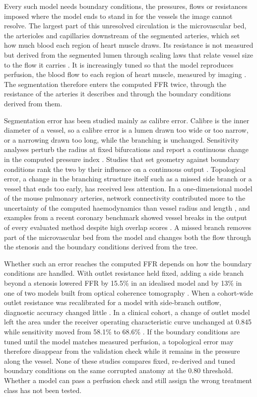 \documentclass[journal]{IEEEtran}
\begin{document}
Every such model needs boundary conditions, the pressures, flows or resistances imposed where the model ends to stand in for the vessels the image cannot resolve. The largest part of this unresolved circulation is the
microvascular bed, the arterioles and capillaries downstream of the segmented arteries, which set how much blood
each region of heart muscle draws. Its resistance is not measured but derived from the segmented lumen through
scaling laws that relate vessel size to the flow it carries \cite{murray1926,kim2010}. It is increasingly tuned so
that the model reproduces perfusion, the blood flow to each region of heart muscle, measured by imaging
\cite{menon2024}. The segmentation therefore enters the computed FFR twice, through the resistance of the arteries it describes and through the boundary conditions derived from them.

Segmentation error has been studied mainly as calibre error. Calibre is the inner diameter of a vessel, so a calibre error is a lumen drawn too wide or too narrow, or a narrowing drawn too long, while the branching is unchanged. Sensitivity analyses perturb the radius at fixed bifurcations and report a continuous change in the computed pressure index \cite{sankaran2015tmi,sankaran2015cmame,fernandez2024,dalmaso2025}. Studies that set geometry against
boundary conditions rank the two by their influence on a continuous output \cite{sankaran2016,tanade2022,korte2023}. Topological error, a change in the branching structure itself such as a missed side branch or a vessel that ends too early, has received less attention. In a one-dimensional model of the mouse pulmonary arteries, network connectivity contributed more to the uncertainty of the computed haemodynamics than vessel radius and length \cite{colebank2019}, and examples from a recent coronary benchmark showed vessel breaks in the output of every evaluated method despite high overlap scores \cite{bransby2026}. A missed branch removes part of the microvascular bed from the model and changes both the flow
through the stenosis and the boundary conditions derived from the tree.

Whether such an error reaches the computed FFR depends on how the boundary conditions are handled. With outlet resistance held fixed, adding a side branch beyond a stenosis lowered FFR by 15.5\% in an idealised model and by 13\% in one of two models built from optical coherence tomography \cite{gamage2022}. When a cohort-wide outlet resistance was recalibrated for a model with side-branch outflow, diagnostic accuracy changed little \cite{gosling2020}. In a clinical cohort, a change of outlet
model left the area under the receiver operating characteristic curve unchanged at 0.845 while sensitivity moved
from 58.1\% to 68.6\% \cite{fossan2026}. If the boundary conditions are tuned until the model matches measured
perfusion, a topological error may therefore disappear from the validation check while it remains in the pressure
along the vessel. None of these studies compares fixed, re-derived and tuned boundary conditions on the same
corrupted anatomy at the 0.80 threshold. Whether a model can pass a perfusion check and still assign the wrong
treatment class has not been tested.
\end{document}
